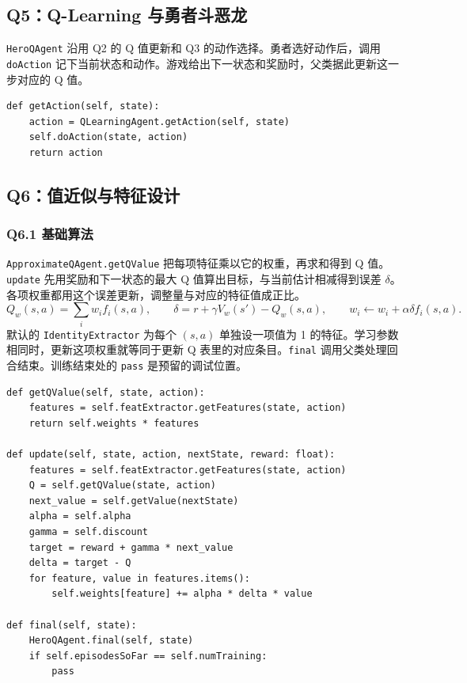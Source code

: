 \documentclass[UTF8,fontset=fandol,a4paper,11pt]{ctexart}
\newcommand{\code}[1]{\texttt{#1}}
\begin{document}
\subsection{Q5：Q-Learning 与勇者斗恶龙}

\code{HeroQAgent} 沿用 Q2 的 Q 值更新和 Q3 的动作选择。勇者选好动作后，调用 \code{doAction} 记下当前状态和动作。游戏给出下一状态和奖励时，父类据此更新这一步对应的 Q 值。
\begin{lstlisting}
def getAction(self, state):
    action = QLearningAgent.getAction(self, state)
    self.doAction(state, action)
    return action
\end{lstlisting}

\subsection{Q6：值近似与特征设计}

\subsubsection*{Q6.1 基础算法}

\code{ApproximateQAgent.getQValue} 把每项特征乘以它的权重，再求和得到 Q 值。\code{update} 先用奖励和下一状态的最大 Q 值算出目标，与当前估计相减得到误差 $\delta$。各项权重都用这个误差更新，调整量与对应的特征值成正比。
\[
  Q_w(s,a)=\sum_i w_i f_i(s,a),\qquad
  \delta=r+\gamma V_w(s')-Q_w(s,a),\qquad
  w_i\gets w_i+\alpha\delta f_i(s,a).
\]
默认的 \code{IdentityExtractor} 为每个 $(s,a)$ 单独设一项值为 1 的特征。学习参数相同时，更新这项权重就等同于更新 Q 表里的对应条目。\code{final} 调用父类处理回合结束。训练结束处的 \code{pass} 是预留的调试位置。
\begin{lstlisting}
def getQValue(self, state, action):
    features = self.featExtractor.getFeatures(state, action)
    return self.weights * features

def update(self, state, action, nextState, reward: float):
    features = self.featExtractor.getFeatures(state, action)
    Q = self.getQValue(state, action)
    next_value = self.getValue(nextState)
    alpha = self.alpha
    gamma = self.discount
    target = reward + gamma * next_value
    delta = target - Q
    for feature, value in features.items():
        self.weights[feature] += alpha * delta * value

def final(self, state):
    HeroQAgent.final(self, state)
    if self.episodesSoFar == self.numTraining:
        pass
\end{lstlisting}
\end{document}
